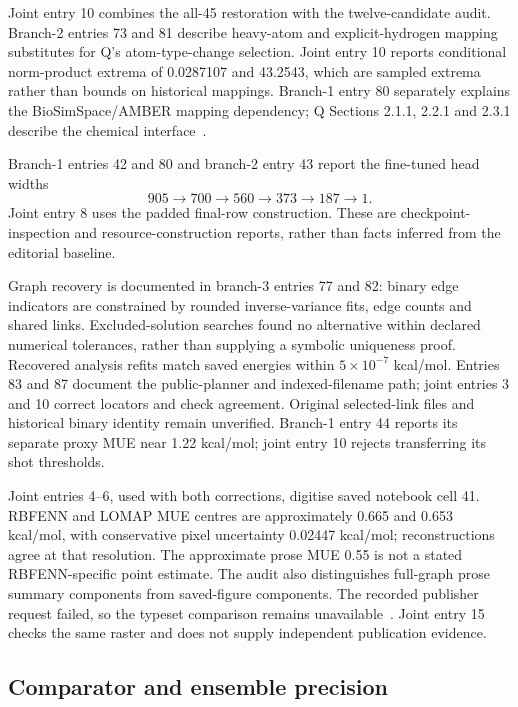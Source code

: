 \documentclass{article}
\begin{document}
Joint entry 10 combines the all-45 restoration with the twelve-candidate audit. Branch-2 entries 73 and 81 describe heavy-atom and explicit-hydrogen mapping substitutes for Q's atom-type-change selection. Joint entry 10 reports conditional norm-product extrema of 0.0287107 and 43.2543, which are sampled extrema rather than bounds on historical mappings. Branch-1 entry 80 separately explains the BioSimSpace/AMBER mapping dependency; Q Sections 2.1.1, 2.2.1 and 2.3.1 describe the chemical interface~\cite{Q}.

Branch-1 entries 42 and 80 and branch-2 entry 43 report the fine-tuned head widths
\[
905\longrightarrow700\longrightarrow560\longrightarrow373
\longrightarrow187\longrightarrow1.
\]
Joint entry 8 uses the padded final-row construction. These are checkpoint-inspection and resource-construction reports, rather than facts inferred from the editorial baseline.

Graph recovery is documented in branch-3 entries 77 and 82: binary edge indicators are constrained by rounded inverse-variance fits, edge counts and shared links. Excluded-solution searches found no alternative within declared numerical tolerances, rather than supplying a symbolic uniqueness proof. Recovered analysis refits match saved energies within \(5\times10^{-7}\) kcal/mol. Entries 83 and 87 document the public-planner and indexed-filename path; joint entries 3 and 10 correct locators and check agreement. Original selected-link files and historical binary identity remain unverified. Branch-1 entry 44 reports its separate proxy MUE near 1.22 kcal/mol; joint entry 10 rejects transferring its shot thresholds.

Joint entries 4--6, used with both corrections, digitise saved notebook cell 41. RBFENN and LOMAP MUE centres are approximately 0.665 and 0.653 kcal/mol, with conservative pixel uncertainty 0.02447 kcal/mol; reconstructions agree at that resolution. The approximate prose MUE 0.55 is not a stated RBFENN-specific point estimate. The audit also distinguishes full-graph prose summary components from saved-figure components. The recorded publisher request failed, so the typeset comparison remains unavailable~\cite{Q,Qnotebook,publisher}. Joint entry 15 checks the same raster and does not supply independent publication evidence.

\subsection{Comparator and ensemble precision}
\end{document}
